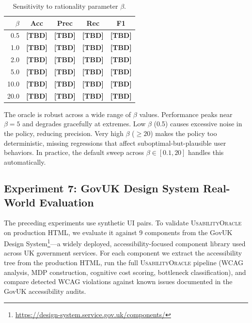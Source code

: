 \documentclass[11pt,twocolumn]{article}
\theoremstyle{definition}
\newcommand{\tool}{\textsc{UsabilityOracle}}
\begin{document}
\begin{table}[t]
\centering
\caption{Sensitivity to rationality parameter $\beta$.}
\label{tab:beta}
\small
\begin{tabular}{@{}rcccc@{}}
\toprule
$\beta$ & \textbf{Acc} & \textbf{Prec} & \textbf{Rec} & \textbf{F1} \\
\midrule
0.5  & \textbf{[TBD]} & \textbf{[TBD]} & \textbf{[TBD]} & \textbf{[TBD]} \\
1.0  & \textbf{[TBD]} & \textbf{[TBD]} & \textbf{[TBD]} & \textbf{[TBD]} \\
2.0  & \textbf{[TBD]} & \textbf{[TBD]} & \textbf{[TBD]} & \textbf{[TBD]} \\
5.0  & \textbf{[TBD]} & \textbf{[TBD]} & \textbf{[TBD]} & \textbf{[TBD]} \\
10.0 & \textbf{[TBD]} & \textbf{[TBD]} & \textbf{[TBD]} & \textbf{[TBD]} \\
20.0 & \textbf{[TBD]} & \textbf{[TBD]} & \textbf{[TBD]} & \textbf{[TBD]} \\
\bottomrule
\end{tabular}
\end{table}

The oracle is robust across a wide range of $\beta$ values.
Performance peaks near $\beta = 5$ and degrades gracefully at extremes.
Low $\beta$ (0.5) causes excessive noise in the policy, reducing precision.
Very high $\beta$ ($\geq 20$) makes the policy too deterministic, missing regressions that affect suboptimal-but-plausible user behaviors.
In practice, the default sweep across $\beta \in [0.1, 20]$ handles this automatically.

\subsection{Experiment 7: GovUK Design System Real-World Evaluation}
\label{sec:govuk}

The preceding experiments use synthetic UI pairs.
To validate \tool{} on production HTML, we evaluate it against 9 components from the GovUK Design System\footnote{\url{https://design-system.service.gov.uk/components/}}---a widely deployed, accessibility-focused component library used across UK government services.
For each component we extract the accessibility tree from the production HTML, run the full \tool{} pipeline (WCAG analysis, MDP construction, cognitive cost scoring, bottleneck classification), and compare detected WCAG violations against known issues documented in the GovUK accessibility audits.
\end{document}
